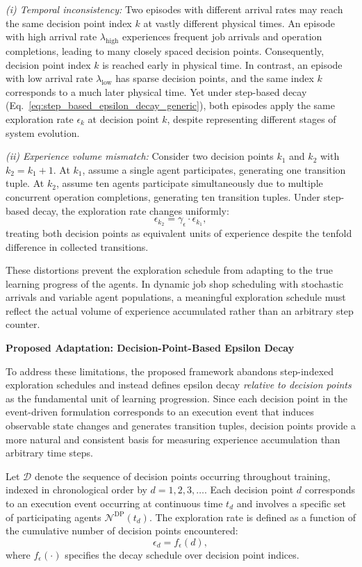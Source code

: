 \textit{(i) Temporal inconsistency:} Two episodes with different arrival rates may reach the same decision point index $k$ at vastly different physical times. An episode with high arrival rate $\lambda_{\text{high}}$ experiences frequent job arrivals and operation completions, leading to many closely spaced decision points. Consequently, decision point index $k$ is reached early in physical time. In contrast, an episode with low arrival rate $\lambda_{\text{low}}$ has sparse decision points, and the same index $k$ corresponds to a much later physical time. Yet under step-based decay (Eq.~\eqref{eq:step_based_epsilon_decay_generic}), both episodes apply the same exploration rate $\epsilon_k$ at decision point $k$, despite representing different stages of system evolution.

\textit{(ii) Experience volume mismatch:} Consider two decision points $k_1$ and $k_2$ with $k_2 = k_1 + 1$. At $k_1$, assume a single agent participates, generating one transition tuple. At $k_2$, assume ten agents participate simultaneously due to multiple concurrent operation completions, generating ten transition tuples. Under step-based decay, the exploration rate changes uniformly:
\begin{equation}
\epsilon_{k_2} = \gamma_{\epsilon} \cdot \epsilon_{k_1},
\end{equation}
treating both decision points as equivalent units of experience despite the tenfold difference in collected transitions.

These distortions prevent the exploration schedule from adapting to the true learning progress of the agents. In dynamic job shop scheduling with stochastic arrivals and variable agent populations, a meaningful exploration schedule must reflect the actual volume of experience accumulated rather than an arbitrary step counter.

\textbf{Proposed Adaptation: Decision-Point-Based Epsilon Decay}

To address these limitations, the proposed framework abandons step-indexed exploration schedules and instead defines epsilon decay \textit{relative to decision points} as the fundamental unit of learning progression. Since each decision point in the event-driven formulation corresponds to an execution event that induces observable state changes and generates transition tuples, decision points provide a more natural and consistent basis for measuring experience accumulation than arbitrary time steps.

Let $\mathcal{D}$ denote the sequence of decision points occurring throughout training, indexed in chronological order by $d = 1, 2, 3, \ldots$. Each decision point $d$ corresponds to an execution event occurring at continuous time $t_d$ and involves a specific set of participating agents $\mathcal{N}^{\mathrm{DP}}(t_d)$. The exploration rate is defined as a function of the cumulative number of decision points encountered:
\begin{equation}
\epsilon_d = f_{\epsilon}(d),
\label{eq:epsilon_as_function_of_decision_points}
\end{equation}
where $f_{\epsilon}(\cdot)$ specifies the decay schedule over decision point indices.


